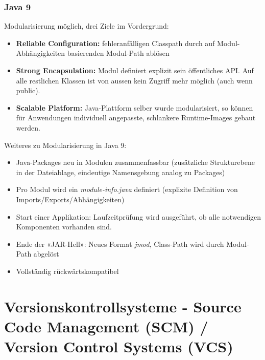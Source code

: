\documentclass[a4paper]{article}
\begin{document}
	\subsubsection{Java 9}
	Modularisierung möglich, drei Ziele im Vordergrund:
	\begin{itemize}
		\setlength\itemsep{0em}
		\item \textbf{Reliable Configuration:} fehleranfälligen Classpath durch auf Modul-Abhängigkeiten basierenden Modul-Path ablösen
		\item \textbf{Strong Encapsulation:} Modul definiert explizit sein öffentliches API. Auf alle restlichen Klassen ist von aussen kein Zugriff mehr möglich (auch wenn public).
		\item \textbf{Scalable Platform:} Java-Plattform selber wurde modularisiert, so können für Anwendungen individuell angepasste, schlankere Runtime-Images gebaut werden.
	\end{itemize}
	Weiteres zu Modularisierung in Java 9:
	\begin{itemize}
		\setlength\itemsep{0em}
		\item Java-Packages neu in Modulen zusammenfassbar (zusätzliche Strukturebene in der Dateiablage, eindeutige Namensgebung analog zu Packages)
		\item Pro Modul wird ein \textit{module-info.java} definiert (explizite Definition von Imports/Exports/Abhängigkeiten)
		\item Start einer Applikation: Laufzeitprüfung wird ausgeführt, ob alle notwendigen Komponenten vorhanden sind.
		\item Ende der «JAR-Hell»: Neues Format \textit{jmod}, Class-Path wird durch Modul-Path abgelöst
		\item Vollständig rückwärtskompatibel
	\end{itemize}

	
	\newpage	
	\section{Versionskontrollsysteme - Source Code Management (SCM) / Version Control Systems (VCS)}
	
\end{document}
